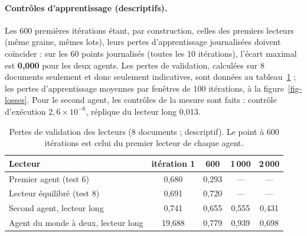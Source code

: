 \documentclass[11pt,a4paper]{article}
\begin{document}
\paragraph{Contrôles d'apprentissage (descriptifs).} Les 600 premières itérations
étant, par construction, celles des premiers lecteurs (même graine, mêmes lots),
leurs pertes d'apprentissage journalisées doivent coïncider : sur les 60 points
journalisés (toutes les 10 itérations), l'écart maximal est \textbf{0,000} pour les
deux agents. Les pertes de validation, calculées sur 8 documents seulement et donc
seulement indicatives, sont données au tableau~\ref{tab-t11loss} ; les pertes
d'apprentissage moyennes par fenêtres de 100 itérations, à la
figure~\ref{fig-losses}. Pour le second agent, les contrôles de la mesure sont
faits : contrôle d'exécution $2,6\times10^{-6}$, réplique du lecteur long 0,013.

\begin{table}[t]
\centering
\caption{Pertes de validation des lecteurs (8 documents ; descriptif). Le point à
600 itérations est celui du premier lecteur de chaque agent.}
\label{tab-t11loss}
\small
\begin{tabular}{@{}l cccc@{}}
\toprule
Lecteur & itération 1 & 600 & 1\,000 & 2\,000 \\
\midrule
Premier agent (test 6) & 0,680 & 0,293 & --- & --- \\
Lecteur équilibré (test 8) & 0,691 & 0,720 & --- & --- \\
Second agent, lecteur long & 0,741 & 0,655 & 0,555 & 0,431 \\
Agent du monde à deux, lecteur long & 19,688 & 0,779 & 0,939 & 0,698 \\
\bottomrule
\end{tabular}
\end{table}
\end{document}
